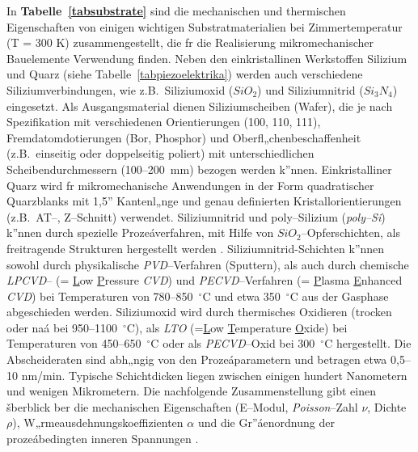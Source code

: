 In {\bf Tabelle~\ref{tabsubstrate}} sind die mechanischen und
thermischen Eigenschaften von einigen wichtigen Substratmaterialien
bei Zimmertemperatur (T = 300 K) zusammengestellt, die fr die
Realisierung mikromechanischer Bauelemente Verwendung finden.  Neben den
einkristallinen Werkstoffen Silizium und Quarz (siehe
Tabelle~\ref{tabpiezoelektrika})
werden auch verschiedene Siliziumverbindungen, wie z.B.\ Siliziumoxid
($ SiO_{2} $) und Siliziumnitrid ($ Si_{3}N_{4} $) eingesetzt.  Als
Ausgangsmaterial
dienen Siliziumscheiben (Wafer), die je nach Spezifikation mit
verschiedenen Orientierungen (100, 110, 111), Fremdatomdotierungen (Bor,
Phosphor) und Oberfl„chenbeschaffenheit (z.B.\ einseitig oder doppelseitig
poliert) mit unterschiedlichen Scheibendurchmessern (100--200~mm) bezogen
werden k”nnen. Einkristalliner Quarz wird fr mikromechanische
Anwendungen in der Form quadratischer Quarzblanks mit 1,5'' Kantenl„nge und
genau definierten Kristallorientierungen (z.B.\ AT--, Z--Schnitt) verwendet.
Siliziumnitrid und poly--Silizium ({\em poly--Si}) k”nnen durch spezielle
Prozeáverfahren, mit Hilfe von $SiO_{2}$--Opferschichten,
als freitragende Strukturen hergestellt werden \cite{Kam90}.
Siliziumnitrid-Schichten k”nnen sowohl durch physikalische
{\em PVD}--Verfahren
(Sputtern), als auch durch chemische {\em LPCVD}-- (= \underline{L}ow
\underline{P}ressure {\sl CVD}) und {\em PECVD}--Verfahren
(= \underline{P}lasma \underline{E}nhanced {\em CVD}) bei Temperaturen
von 780--850~$^\circ$C und etwa 350~$^\circ$C aus der Gasphase
abgeschieden werden. Siliziumoxid wird durch thermisches Oxidieren
(trocken oder naá bei 950--1100~$^\circ$C), als {\em LTO}
(=\underline{L}ow \underline{T}emperature \underline{O}xide) bei
Temperaturen von 450--650~$^\circ$C oder als {\em PECVD}--Oxid bei
300~$^\circ$C hergestellt. Die Abscheideraten sind abh„ngig von
den Prozeáparametern und betragen etwa 0,5--10 nm/min. Typische
Schichtdicken liegen zwischen einigen hundert Nanometern und wenigen
Mikrometern. Die nachfolgende Zusammenstellung gibt einen šberblick ber
die mechanischen Eigenschaften (E--Modul, {\sl Poisson}--Zahl $\nu$,
Dichte $\rho$), W„rmeausdehnungskoeffizienten $\alpha$ und die Gr”áenordnung
der prozeábedingten inneren Spannungen
\cite{Bach, Bue91a, Heu89, Kam90, Pet79, Tab89, Wandt}.
